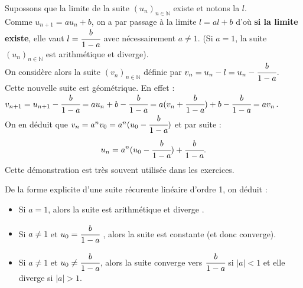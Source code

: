 \documentclass[french]{book}
\newcommand{\N}{\mathbb {N}}
\newcommand{\pa}[1]{(#1)}
\newcommand{\suite}[1][u]{\left( #1_{n} \right)_{n\in\N}}
\newcommand{\un}{\suite}
\newcommand{\vn}{\suite[v]}
\newcommand{\abs}[1]{\vert #1 \vert}
\begin{document}
\begin{demo}
Supossons que la limite de la suite $\un$ existe et notons la $l$.\\
Comme $u_{n+1} = au_n + b$, on a par passage à la limite $l=al+b$ d'où \textbf{si la limite existe}, elle vaut $l=\cfrac{b}{1-a}$ avec nécessairement $a\neq1$. (Si $a=1$, la suite $\un$ est arithmétique et diverge).\\
On considère alors la suite $\vn$ définie par $v_n=u_n-l=u_n-\cfrac{b}{1-a}$.\\
Cette nouvelle suite est géométrique. En effet :\\
$v_{n+1}=u_{n+1}-\cfrac{b}{1-a}=au_n+b-\cfrac{b}{1-a}=a\pa{v_n+\cfrac{b}{1-a}}+b-\cfrac{b}{1-a}=av_n$.\\
On en déduit que $v_n=a^nv_0=a^n\pa{u_0-\cfrac{b}{1-a}}$ et par suite :
$$u_n = a^n \pa{u_0-\cfrac{b}{1-a}}+ \cfrac{b}{1-a}.$$
Cette démonstration est très souvent utilisée dans les exercices.
\end{demo}





\begin{thm}[Convergence]
De la forme explicite d'une suite récurente linéaire d'ordre 1, on déduit :
	\begin{itemize}
	\item Si $a = 1$, alors la suite est arithmétique et diverge .
	\item Si $a\neq1$ et $u_0 =\cfrac{b}{1-a}$ , alors la suite est constante (et donc converge).
	\item Si $a\neq 1$ et $u_0\neq \cfrac{b}{1-a}$, alors la suite converge vers $\cfrac{b}{1-a}$ si $\abs{a}<1$ et elle diverge si $\abs{a}>1$.
\end{itemize}

\end{thm}
\end{document}
